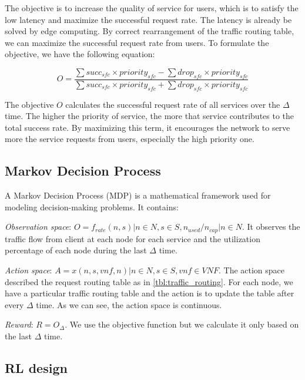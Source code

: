 \documentclass[conference]{IEEEtran}
\begin{document}
The objective is to increase the quality of service for users, which is to satisfy the low latency and maximize the successful request rate. The latency is already be solved by edge computing. By correct rearrangement of the traffic routing table, we can maximize the successful request rate from users. To formulate the objective, we have the following equation: 

\begin{equation}
    \label{eqn:reward}
    O = \frac{\sum succ_{sfc} \times priority_{sfc} - \sum drop_{sfc} \times priority_{sfc}}{\sum succ_{sfc} \times priority_{sfc} + \sum drop_{sfc} \times priority_{sfc}}
\end{equation}

The objective $O$ calculates the successful request rate of all services over the $\Delta$ time. The higher the priority of service, the more that service contributes to the total success rate. By maximizing this term, it encourages the network to serve more the service requests from users, especially the high priority one.

\subsection{Markov Decision Process}
\label{subsec:POMDP}
A Markov Decision Process (MDP) is a mathematical framework used for modeling decision-making problems. It contains:

\textit{Observation space}: $O = {f_{rate}(n,s) | n \in N, s \in S}, {n_{used} / n_{cap} | n \in N}$. It observes the traffic flow from client at each node for each service and the utilization percentage of each node during the last $\Delta$ time. 

\textit{Action space}: $A = x(n,s,vnf,n) | n \in N, s \in S, vnf \in VNF$. The action space described the request routing table as in \ref{tbl:traffic_routing}. For each node, we have a particular traffic routing table and the action is to update the table after every $\Delta$ time. As we can see, the action space is continuous. 

\textit{Reward}: $R = O_{\Delta}$. We use the objective function but we calculate it only based on the last $\Delta$ time.

\subsection{RL design}
\label{subsec:RL_design}
\end{document}
